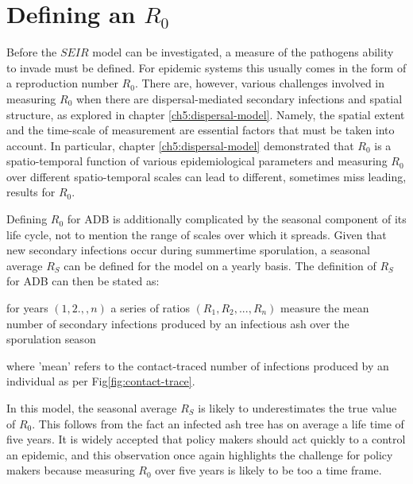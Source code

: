 \section{Defining an $R_0$}

Before the $SEIR$ model can be investigated, a measure of the pathogens ability to invade must be defined. For epidemic systems this usually comes in the form of a reproduction number $R_0$. There are, however, various challenges involved in measuring $R_0$ when there are dispersal-mediated secondary infections and spatial structure, as explored in chapter \ref{ch5:dispersal-model}. Namely, the spatial extent and the time-scale of measurement are essential factors that must be taken into account. In particular, chapter \ref{ch5:dispersal-model} demonstrated that $R_0$ is a spatio-temporal function of various epidemiological parameters and measuring $R_0$ over different spatio-temporal scales can lead to different, sometimes miss leading, results for $R_0$. 

Defining $R_0$ for ADB is additionally complicated by the seasonal component of its life cycle, not to mention the range of scales over which it spreads. Given that new secondary infections occur during summertime sporulation, a seasonal average $R_S$ can be defined for the model on a yearly basis. The definition of $R_S$ for ADB can then be stated as:
\begin{defn}
for years $(1,2.,,n)$ a series of ratios $(R_{1},R_2,...,R_{n})$ measure the mean number of secondary infections produced by an infectious ash over the sporulation season
\end{defn}
where 'mean' refers to the contact-traced number of infections produced by an individual as per Fig\ref{fig:contact-trace}.

In this model, the seasonal average $R_S$ is likely to underestimates the true value of $R_0$. This follows from the fact an infected ash tree has on average a life time of five years. It is widely accepted that policy makers should act quickly to a control an epidemic, and this observation once again highlights the challenge for policy makers because measuring $R_0$ over five years is likely to be too a time frame.





